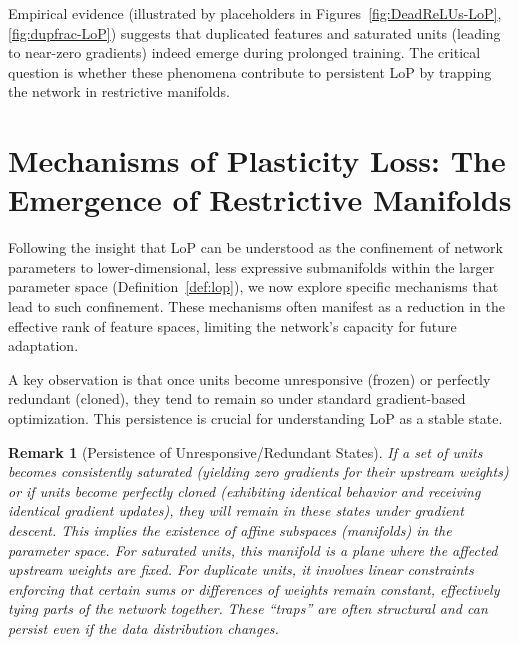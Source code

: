 \documentclass{article}
\newtheorem{remark}{Remark}[section]
\begin{document}
Empirical evidence (illustrated by placeholders in Figures~\ref{fig:DeadReLUs-LoP}, \ref{fig:dupfrac-LoP}) suggests that duplicated features and saturated units (leading to near-zero gradients) indeed emerge during prolonged training. The critical question is whether these phenomena contribute to persistent LoP by trapping the network in restrictive manifolds.

\section{Mechanisms of Plasticity Loss: The Emergence of Restrictive Manifolds}
\label{sec:mechanisms_lop}
Following the insight that LoP can be understood as the confinement of network parameters to lower-dimensional, less expressive submanifolds within the larger parameter space (Definition~\ref{def:lop}), we now explore specific mechanisms that lead to such confinement. These mechanisms often manifest as a reduction in the effective rank of feature spaces, limiting the network's capacity for future adaptation.

A key observation is that once units become unresponsive (frozen) or perfectly redundant (cloned), they tend to remain so under standard gradient-based optimization. This persistence is crucial for understanding LoP as a stable state.
\begin{remark}[Persistence of Unresponsive/Redundant States]
If a set of units becomes consistently saturated (yielding zero gradients for their upstream weights) or if units become perfectly cloned (exhibiting identical behavior and receiving identical gradient updates), they will remain in these states under gradient descent. This implies the existence of affine subspaces (manifolds) in the parameter space. For saturated units, this manifold is a plane where the affected upstream weights are fixed. For duplicate units, it involves linear constraints enforcing that certain sums or differences of weights remain constant, effectively tying parts of the network together. These ``traps'' are often structural and can persist even if the data distribution changes.
\end{remark}
\end{document}
